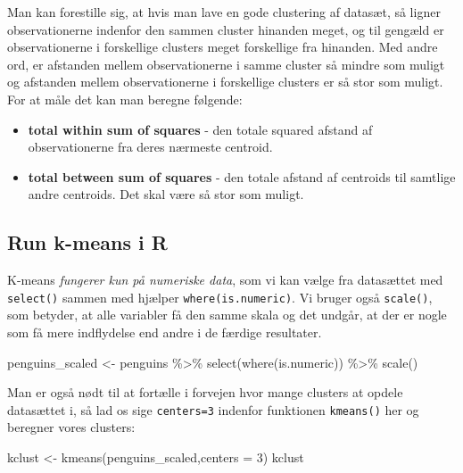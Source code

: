 \documentclass[
]{book}
\newenvironment{Shaded}{\begin{snugshade}}{\end{snugshade}}
\newcommand{\AttributeTok}[1]{\textcolor[rgb]{0.77,0.63,0.00}{#1}}
\newcommand{\DecValTok}[1]{\textcolor[rgb]{0.00,0.00,0.81}{#1}}
\newcommand{\FunctionTok}[1]{\textcolor[rgb]{0.00,0.00,0.00}{#1}}
\newcommand{\NormalTok}[1]{#1}
\newcommand{\OtherTok}[1]{\textcolor[rgb]{0.56,0.35,0.01}{#1}}
\newcommand{\SpecialCharTok}[1]{\textcolor[rgb]{0.00,0.00,0.00}{#1}}
\providecommand{\tightlist}{%
  \setlength{\itemsep}{0pt}\setlength{\parskip}{0pt}}
\begin{document}
Man kan forestille sig, at hvis man lave en gode clustering af datasæt, så ligner observationerne indenfor den sammen cluster hinanden meget, og til gengæld er observationerne i forskellige clusters meget forskellige fra hinanden. Med andre ord, er afstanden mellem observationerne i samme cluster så mindre som muligt og afstanden mellem observationerne i forskellige clusters er så stor som muligt. For at måle det kan man beregne følgende:

\begin{itemize}
\tightlist
\item
  \textbf{total within sum of squares} - den totale squared afstand af observationerne fra deres nærmeste centroid.
\item
  \textbf{total between sum of squares} - den totale afstand af centroids til samtlige andre centroids. Det skal være så stor som muligt.
\end{itemize}

\hypertarget{run-k-means-i-r}{%
\subsection{Run k-means i R}\label{run-k-means-i-r}}

K-means \emph{fungerer kun på numeriske data}, som vi kan vælge fra datasættet med \texttt{select()} sammen med hjælper \texttt{where(is.numeric)}. Vi bruger også \texttt{scale()}, som betyder, at alle variabler få den samme skala og det undgår, at der er nogle som få mere indflydelse end andre i de færdige resultater.

\begin{Shaded}
\begin{Highlighting}[]
\NormalTok{penguins\_scaled }\OtherTok{\textless{}{-}}\NormalTok{ penguins }\SpecialCharTok{\%\textgreater{}\%} 
  \FunctionTok{select}\NormalTok{(}\FunctionTok{where}\NormalTok{(is.numeric)) }\SpecialCharTok{\%\textgreater{}\%} 
  \FunctionTok{scale}\NormalTok{()}
\end{Highlighting}
\end{Shaded}

Man er også nødt til at fortælle i forvejen hvor mange clusters at opdele datasættet i, så lad os sige \texttt{centers=3} indenfor funktionen \texttt{kmeans()} her og beregner vores clusters:

\begin{Shaded}
\begin{Highlighting}[]
\NormalTok{kclust }\OtherTok{\textless{}{-}} \FunctionTok{kmeans}\NormalTok{(penguins\_scaled,}\AttributeTok{centers =} \DecValTok{3}\NormalTok{)}
\NormalTok{kclust}
\end{Highlighting}
\end{Shaded}
\end{document}
